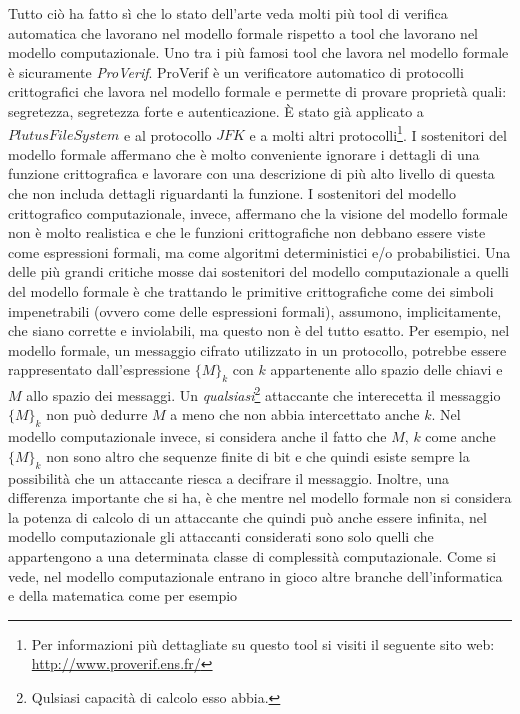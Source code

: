 \documentclass[a4paper,openright,twoside,12pt]{report}
\begin{document}
Tutto ci\`o ha fatto s\`i che lo stato dell'arte veda molti pi\`u tool di
verifica automatica che lavorano nel modello formale rispetto a tool che lavorano nel modello computazionale. 
Uno tra i pi\`u famosi tool che lavora nel modello formale \`e sicuramente \emph{ProVerif}. 
ProVerif \`e un verificatore automatico di protocolli crittografici che lavora nel modello formale e permette di provare
propriet\`a quali: segretezza, segretezza forte e autenticazione. \`E stato gi\`a applicato a $Plutus FileSystem$ e 
al protocollo $JFK$ e a molti altri protocolli\footnote{Per informazioni pi\`u dettagliate su questo tool si visiti il seguente sito web: 
\url{http://www.proverif.ens.fr/}}.
I sostenitori del modello formale affermano che \`e molto conveniente ignorare i dettagli di una funzione crittografica 
e lavorare con una descrizione 
di pi\`u alto livello di questa che non includa dettagli riguardanti la funzione. 
I sostenitori del modello crittografico computazionale, invece, affermano che la visione
del modello formale non \`e molto realistica e che le funzioni crittografiche non debbano essere viste come espressioni 
formali, ma come algoritmi deterministici e/o probabilistici. Una delle pi\`u grandi critiche mosse dai sostenitori del modello
computazionale a quelli del modello formale \`e che trattando le primitive crittografiche come dei simboli impenetrabili (ovvero come delle espressioni formali), 
assumono, implicitamente, che siano corrette e inviolabili, ma questo non \`e
del tutto esatto. Per esempio, nel modello formale, un messaggio cifrato utilizzato in un protocollo,  
potrebbe essere rappresentato dall'espressione $\{M\}_k$ con $k$ appartenente allo spazio delle chiavi
e $M$ allo spazio dei messaggi. Un \emph{qualsiasi}\footnote{Qulsiasi capacit\`a di calcolo esso abbia.} 
attaccante che interecetta il messaggio $\{M\}_k$ non pu\`o dedurre $M$ a meno
che non abbia intercettato anche $k$. Nel modello computazionale invece, si considera anche il fatto
che $M$, $k$ come anche $\{M\}_k$ non sono altro che sequenze finite di bit e che quindi esiste sempre la possibilit\`a
che un attaccante riesca a decifrare il messaggio. Inoltre, una differenza importante che si ha, \`e che mentre nel modello
formale non si considera la potenza di calcolo di un attaccante che quindi pu\`o anche essere infinita, nel modello computazionale
gli attaccanti considerati sono solo quelli che appartengono a una determinata classe di complessit\`a computazionale.
Come si vede, nel modello computazionale entrano in gioco altre branche dell'informatica e della matematica come per esempio
\end{document}
